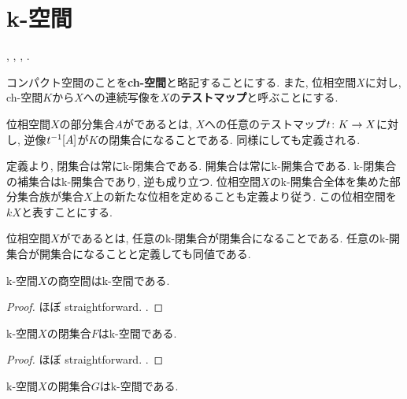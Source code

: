 \documentclass[uplatex, dvipdfmx, a4paper, 12pt, class=jsbook, crop=false]{standalone}
\begin{document}
\section{k-空間}
\label{sec:k-spaces}

\begin{source}
	\cite[Section 7.9]{Dieck2008AT},
	\cite{Strickland2009CGWH},
	\cite{Rezk2017CGS},
	\cite{Rezk0000K}.
\end{source}

コンパクト\Hausdorff 空間のことを\textbf{ch-空間}と略記することにする.
また, 位相空間$X$に対し, ch-空間$K$から$X$への連続写像を$X$の\textbf{テストマップ}と呼ぶことにする.

\begin{definition}
	位相空間$X$の部分集合$A$がであるとは,
	$X$への任意のテストマップ$t\colon K\to X$に対し,
	逆像$\mapinvset{t}{A}$が$K$の閉集合になることである.
	同様にしても定義される.
\end{definition}

定義より, 閉集合は常にk-閉集合である.
開集合は常にk-開集合である.
k-閉集合の補集合はk-開集合であり, 逆も成り立つ.
位相空間$X$のk-開集合全体を集めた部分集合族が集合$X$上の新たな位相を定めることも定義より従う.
この位相空間を$kX$と表すことにする.

\begin{definition}
	位相空間$X$がであるとは,
	任意のk-閉集合が閉集合になることである.
	任意のk-開集合が開集合になることと定義しても同値である.
\end{definition}

\begin{proposition}
	k-空間$X$の商空間はk-空間である.
\end{proposition}

\begin{proof}
	ほぼ straightforward.
	\WIP.
\end{proof}

\begin{proposition}
	k-空間$X$の閉集合$F$はk-空間である.
\end{proposition}

\begin{proof}
	ほぼ straightforward.
	\WIP.
\end{proof}

\begin{proposition}
	k-空間$X$の開集合$G$はk-空間である.
\end{proposition}
\end{document}
